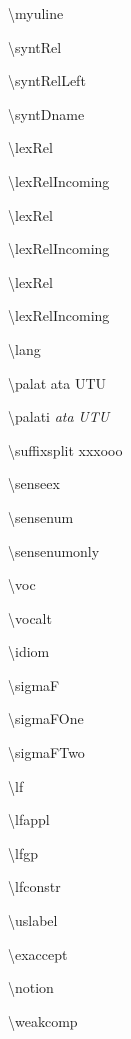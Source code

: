 {\textbackslash}myuline 

{\textbackslash}syntRel 

{\textbackslash}syntRelLeft 


{\textbackslash}syntDname 


{\textbackslash}lexRel 

{\textbackslash}lexRelIncoming 



{\textbackslash}lexRel 

{\textbackslash}lexRelIncoming 


{\textbackslash}lexRel 

{\textbackslash}lexRelIncoming 

{\textbackslash}lang \lang

{\textbackslash}palat at{\palat}a UT{\palat}U

{\textbackslash}palati \textit{at{\palati}a} \textit{UT{\palati}U}

{\textbackslash}suffixsplit xxx\suffixsplit{}ooo

{\textbackslash}senseex 


{\textbackslash}sensenum 


{\textbackslash}sensenumonly 

{\textbackslash}voc 


{\textbackslash}vocalt 


{\textbackslash}idiom 

{\textbackslash}sigmaF \sigmaF


{\textbackslash}sigmaFOne \sigmaFOne


{\textbackslash}sigmaFTwo \sigmaFTwo


{\textbackslash}lf 


{\textbackslash}lfappl 


{\textbackslash}lfgp 

{\textbackslash}lfconstr 

{\textbackslash}uslabel 


{\textbackslash}exaccept 


{\textbackslash}notion 


{\textbackslash}weakcomp 


